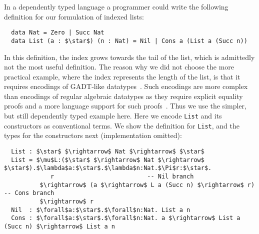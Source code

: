 In a dependently typed language a programmer could write the following definition
for our formulation of indexed lists:
\begin{lstlisting}
  data Nat = Zero | Succ Nat
  data List (a : $\star$) (n : Nat) = Nil | Cons a (List a (Succ n))
\end{lstlisting}
\noindent In this definition, the index grows towards the tail of the list,
which is admittedly not the most useful definition.
The reason why we did not choose the more practical
example, where the index represents the length of the list, is that it requires
encodings of GADT-like datatypes~\citep{gadt1,gadt2}. Such encodings are more
complex than encodings of regular algebraic datatypes as they require explicit
equality proofs and a more language support for such proofs~\citep{yang2019pure}. Thus we use the simpler,
but still dependently typed example here.
Here we encode \lstinline{List} and its constructors as conventional terms. We
show the definition for \lstinline{List}, and the types for the constructors next
(implementation omitted):
\begin{lstlisting}
  List : $\star$ $\rightarrow$ Nat $\rightarrow$ $\star$
  List = $\mu$L:($\star$ $\rightarrow$ Nat $\rightarrow$ $\star$).$\lambda$a:$\star$.$\lambda$n:Nat.$\Pi$r:$\star$.
             r                          -- Nil branch
          $\rightarrow$ (a $\rightarrow$ L a (Succ n) $\rightarrow$ r) -- Cons branch
          $\rightarrow$ r
  Nil  : $\forall$a:$\star$.$\forall$n:Nat. List a n
  Cons : $\forall$a:$\star$.$\forall$n:Nat. a $\rightarrow$ List a (Succ n) $\rightarrow$ List a n
\end{lstlisting}

